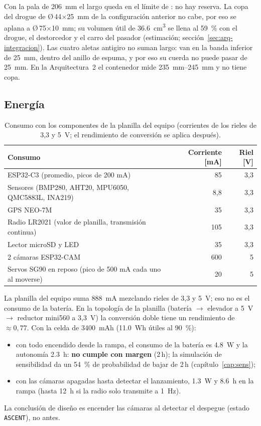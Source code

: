 Con la pala de \SI{206}{mm} el largo queda en el límite de : no hay reserva. La
copa del drogue de Ø\,44$\times$\SI{25}{mm} de la configuración anterior no cabe, por eso se
aplana a Ø\,75$\times$\SI{10}{mm}; su volumen útil de \SI{36.6}{cm^3} se llena al
\SI{59}{\percent} con el drogue, el destorcedor y el carro del pasador (estimación;
sección~\ref{sec:arq-integracion}). Las cuatro aletas antigiro no suman largo: van en la banda
inferior de \SI{25}{mm}, dentro del anillo de espuma, y por eso su cuerda no puede pasar de
\SI{25}{mm}. En la Arquitectura~2 el contenedor mide \SIrange{235}{245}{mm} y no tiene copa.

\subsection{Energía}
\begin{table}[H]
\centering\small
\caption{Consumo con los componentes de la planilla del equipo (corrientes de los rieles
de 3,3 y 5~V; el rendimiento de conversión se aplica después).}\label{tab:energia}
\begin{tabular}{@{}lrr@{}}
\toprule
\textbf{Consumo} & \textbf{Corriente} [mA] & \textbf{Riel} [V]\\\midrule
ESP32-C3 (promedio, picos de 200 mA) & 85 & 3,3\\
Sensores (BMP280, AHT20, MPU6050, QMC5883L, INA219) & 8,8 & 3,3\\
GPS NEO-7M & 35 & 3,3\\
Radio LR2021 (valor de planilla, transmisión continua) & 105 & 3,3\\
Lector microSD y LED & 35 & 3,3\\
2 cámaras ESP32-CAM & 600 & 5\\
Servos SG90 en reposo (pico de 500 mA cada uno al moverse) & 20 & 5\\
\bottomrule
\end{tabular}
\end{table}
La planilla del equipo suma 888~mA mezclando rieles de 3,3 y 5~V; eso no es el consumo de la
batería. En la topología de la planilla (batería $\to$ elevador a 5~V $\to$ reductor mini560
a 3,3~V) la conversión doble tiene un rendimiento de $\approx0{,}77$. Con la celda de
\SI{3400}{mAh} (\SI{11.0}{Wh} útiles al \SI{90}{\percent}):
\begin{itemize}
  \item con todo encendido desde la rampa, el consumo de la batería es \SI{4.8}{W} y la
        autonomía \SI{2.3}{h}: \textbf{no cumple con margen}  (2\,h); la simulación
        de sensibilidad da un \SI{54}{\percent} de probabilidad de bajar de 2\,h
        (capítulo~\ref{cap:sens});
  \item con las cámaras apagadas hasta detectar el lanzamiento, \SI{1.3}{W} y
        \SI{8.6}{h} en la rampa (hasta \SI{12}{h} si la radio solo transmite a \SI{1}{Hz}).
\end{itemize}
La conclusión de diseño es encender las cámaras al detectar el despegue (estado
\texttt{ASCENT}), no antes.
